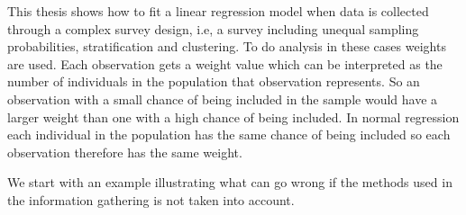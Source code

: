 \documentclass{article}
\begin{document}
This thesis shows how to fit
a linear regression model when data is collected through a complex survey design, i.e,
a survey including unequal sampling probabilities, stratification and
clustering. To do analysis in these cases weights are used. Each observation gets a weight
value which can be interpreted as the number of individuals in the population
that observation represents. So an observation with a small chance of being
included in the sample would have a larger weight than one with a high chance of
being included.
In normal regression each individual in the population has the same chance of
being included so each observation therefore has the same weight.

We start
with an example illustrating what can go wrong if the methods used in the
information gathering is not taken into account.
\end{document}
